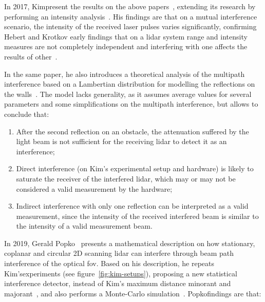

In 2017, Kim\etal present the results on the above papers~\cite{Kim2015a, Kim2015b, Kim2015c}, extending its research by performing an intensity analysis~\cite{Kim2017}. His findings are that on a mutual interference scenario, the intensity of the received laser pulses varies significantly, confirming Hebert and Krotkov early findings that on a \ac{lidar} system range and intensity measures are not completely independent and interfering with one affects the results of other~\cite{Hebert}.

In the same paper, he also introduces a theoretical analysis of the multipath interference based on a Lambertian distribution for modelling the reflections on the walls~\cite{Kim2017}. The model lacks generality, as it assumes average values for several parameters and some simplifications on the multipath interference, but allows to conclude that:

\begin{enumerate}
	\item After the second reflection on an obstacle, the attenuation suffered by the light beam is not sufficient for the receiving \ac{lidar} to detect it as an interference;
	\item Direct interference (on Kim's experimental setup and hardware) is likely to saturate the receiver of the interfered \ac{lidar}, which may or may not be considered a valid measurement by the hardware;
	\item Indirect interference with only one reflection can be interpreted as a valid measurement, since the intensity of the received interfered beam is similar to the intensity of a valid measurement beam.
\end{enumerate}

In 2019, Gerald Popko\etal~\cite{Popko2019a} presents a mathematical description on how stationary, coplanar and circular 2D scanning \ac{lidar} can interfere through beam path interference of the optical \ac{fov}. Based on his description, he repeats Kim's\etal experiments (see figure~\ref{fig:kim-setups}), proposing a new statistical interference detector, instead of Kim's maximum distance minorant and majorant~\cite{Kim2015a}, and also performs a Monte-Carlo simulation~\cite{Popko2019b}. Popko\etal findings are that:

